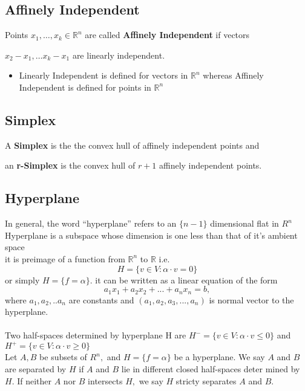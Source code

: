 \documentclass[oneside]{book}
\begin{document}
\subsection{Affinely Independent}
\label{ss:7}
 Points $ x_1, \ldots ,x_k \in \mathbb{R}^n $ are called \textbf{Affinely Independent} if vectors \par
 $x_{2} - x_{1}, \ldots  x_{k} - x_{1} $ are linearly independent.
 
 \begin{itemize}
 \item Linearly Independent is defined for vectors in $\mathbb{R}^n $ whereas Affinely Independent is defined for points in $\mathbb{R}^n $
 \end{itemize}


 

   \subsection{Simplex} 
   \label{ss:8}
 A \textbf{Simplex} is the the convex hull of affinely independent points and \par 
  an \textbf{r-Simplex} is the convex hull of $r+ 1$ affinely independent points.
 
 
 
 
 
  



 \subsection{Hyperplane} 
 \label{ss:9}
 In general, the word “hyperplane” refers to an $\{n-1\}$ dimensional flat in $R^{n}$ \\
 Hyperplane is a subspace whose dimension is one less than that of it's ambient space  
 \\ it is preimage of a function from $\mathbb{R}^{n}$ to $\mathbb{R}$ i.e.
 \begin{equation}
   H=\{v \in V: \alpha \cdot v=0\} 
  \end{equation}  
    or simply  $H = \{f = \alpha \}$. 
   it can be written    as  a linear equation of the form
$$a_1x_1 + a_2x_2 + ... + a_nx_n = b,$$ where $a_1,a_2,..a_n$ are constants and $(a_1,a_2,a_3,...,a_n)$ is normal vector to the hyperplane.
\\\\
 Two half-spaces  determined by hyperplane H are 
$H^{-}=\{v \in V: \alpha \cdot v \leq 0\}$ and  $ H^{+}=\{v \in V: \alpha \cdot v \geq 0\} $ 
\\
Let $A, B$ be subsets of $R^{n},$ and $H=\{f=\alpha\}$ be a hyperplane. We say $A$ and
$B$ are separated by $H$ if $A$ and $B$ lie in different closed half-spaces deter
mined by $H .$ If neither $A$ nor $B$ intersects $H,$ we say $H$ stricty separates $A$
and $B .$\\
\end{document}

